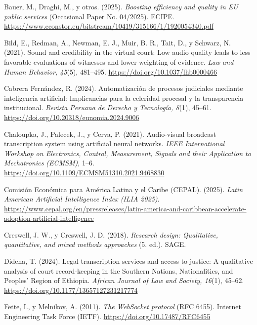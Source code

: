 \documentclass[12pt,a4paper,oneside]{report}
\begin{document}
\vspace{6pt}
Bauer, M., Draghi, M., y otros. (2025). \textit{Boosting efficiency and quality in EU public services} (Occasional Paper No. 04/2025). ECIPE. \url{https://www.econstor.eu/bitstream/10419/315166/1/1920054340.pdf}

\vspace{6pt}
Bild, E., Redman, A., Newman, E. J., Muir, B. R., Tait, D., y Schwarz, N. (2021). Sound and credibility in the virtual court: Low audio quality leads to less favorable evaluations of witnesses and lower weighting of evidence. \textit{Law and Human Behavior, 45}(5), 481--495. \url{https://doi.org/10.1037/lhb0000466}

\vspace{6pt}
Cabrera Fernández, R. (2024). Automatización de procesos judiciales mediante inteligencia artificial: Implicancias para la celeridad procesal y la transparencia institucional. \textit{Revista Peruana de Derecho y Tecnología, 8}(1), 45--61. \url{https://doi.org/10.20318/eunomia.2024.9006}

\vspace{6pt}
Chaloupka, J., Palecek, J., y Cerva, P. (2021). Audio-visual broadcast transcription system using artificial neural networks. \textit{IEEE International Workshop on Electronics, Control, Measurement, Signals and their Application to Mechatronics (ECMSM)}, 1--6. \url{https://doi.org/10.1109/ECMSM51310.2021.9468830}

\vspace{6pt}
Comisión Económica para América Latina y el Caribe (CEPAL). (2025). \textit{Latin American Artificial Intelligence Index (ILIA 2025)}. \url{https://www.cepal.org/en/pressreleases/latin-america-and-caribbean-accelerate-adoption-artificial-intelligence}

\vspace{6pt}
Creswell, J. W., y Creswell, J. D. (2018). \textit{Research design: Qualitative, quantitative, and mixed methods approaches} (5.\textordfeminine{} ed.). SAGE.

\vspace{6pt}
Didena, T. (2024). Legal transcription services and access to justice: A qualitative analysis of court record-keeping in the Southern Nations, Nationalities, and Peoples' Region of Ethiopia. \textit{African Journal of Law and Society, 16}(1), 45--62. \url{https://doi.org/10.1177/13657127231217774}

\vspace{6pt}
Fette, I., y Melnikov, A. (2011). \textit{The WebSocket protocol} (RFC 6455). Internet Engineering Task Force (IETF). \url{https://doi.org/10.17487/RFC6455}
\end{document}
